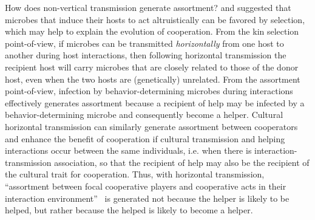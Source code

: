 \documentclass[12pt]{extarticle}
\begin{document}
How does non-vertical transmission generate assortment? 
\citet{lewin2017microbes} and \citet{lewin2020rockpaperscissors} 
suggested that microbes that induce their hosts to act altruistically can be favored by selection, which may help to explain the evolution of cooperation. 
From the kin selection point-of-view, if microbes can be transmitted \emph{horizontally} from one host to another during host interactions, then following horizontal transmission the recipient host will carry microbes that are closely related to those of the donor host, 
even when the two hosts are (genetically) unrelated. 
From the assortment point-of-view,
infection by behavior-determining microbes during interactions effectively generates assortment because a recipient of help may be infected by a behavior-determining microbe and consequently become a helper.
Cultural horizontal transmission can similarly generate assortment between cooperators and enhance the benefit of cooperation if cultural transmission and helping interactions occur between the same individuals, i.e. when there is interaction-transmission association, so that the recipient of help may also be the recipient of the cultural trait for cooperation. 
Thus, with horizontal transmission, ``assortment between focal cooperative players and cooperative acts in their interaction
environment''~\citep{Fletcher2009assortment} is generated not because the helper is likely to be helped, but rather because the helped is likely to become a helper.
\end{document}
